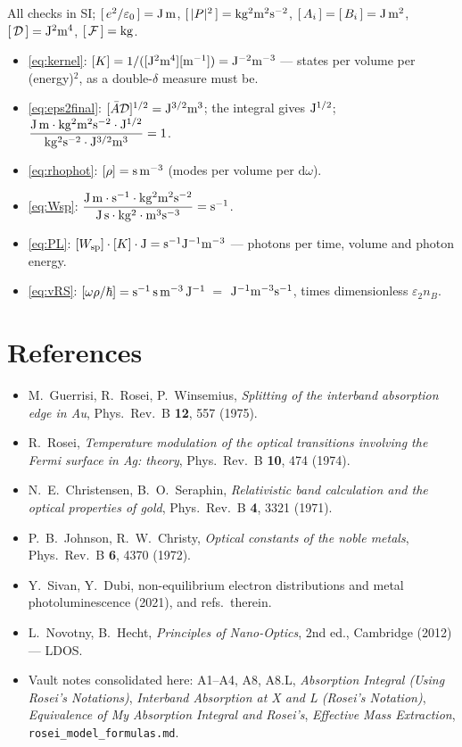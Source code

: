 \documentclass[11pt,a4paper]{article}
\numberwithin{equation}{section}
\newcommand{\cD}{\mathcal{D}}
\newcommand{\cF}{\mathcal{F}}
\newcommand{\Ab}{\bar{A}}
\newcommand{\eps}{\varepsilon}
\newcommand{\epsz}{\varepsilon_0}
\newcommand{\dd}{\mathrm{d}}
\begin{document}
All checks in SI; $[\,e^2/\epsz\,]={\rm J\,m}$,
$[\,|P|^2\,]={\rm kg^2m^2s^{-2}}$, $[\,A_i\,]=[\,B_i\,]={\rm J\,m^2}$,
$[\,\cD\,]={\rm J^2m^4}$, $[\,\cF\,]={\rm kg}$.
\begin{itemize}
\item \eqref{eq:kernel}:
$[K]=1/([{\rm J^2m^4}][{\rm m^{-1}}])={\rm J^{-2}m^{-3}}$ ---
states per volume per (energy)$^2$, as a double-$\delta$ measure must be.
\item \eqref{eq:eps2final}:
$[\Ab\cD]^{1/2}={\rm J^{3/2}m^3}$; the integral gives
${\rm J^{1/2}}$;
$\dfrac{{\rm J\,m}\cdot{\rm kg^2m^2s^{-2}}\cdot{\rm J^{1/2}}}
{{\rm kg^2s^{-2}}\cdot{\rm J^{3/2}m^3}}=1$. \checkmark
\item \eqref{eq:rhophot}: $[\rho]={\rm s\,m^{-3}}$
(modes per volume per $\dd\omega$). \checkmark
\item \eqref{eq:Wsp}:
$\dfrac{{\rm J\,m}\cdot{\rm s^{-1}}\cdot{\rm kg^2m^2s^{-2}}}
{{\rm J\,s}\cdot{\rm kg^2}\cdot{\rm m^3s^{-3}}}={\rm s^{-1}}$. \checkmark
\item \eqref{eq:PL}: $[W_{\rm sp}]\cdot[K]\cdot{\rm J}
={\rm s^{-1}J^{-1}m^{-3}}$ --- photons per time, volume and photon
energy. \checkmark
\item \eqref{eq:vRS}: $[\omega\rho/\hbar]
={\rm s^{-1}\,s\,m^{-3}\,J^{-1}\,}$$=$ ${\rm J^{-1}m^{-3}s^{-1}}$,
times dimensionless $\eps_2n_B$. \checkmark
\end{itemize}

\section*{References}
\begin{itemize}
\item M.~Guerrisi, R.~Rosei, P.~Winsemius,
\emph{Splitting of the interband absorption edge in Au},
Phys.\ Rev.\ B \textbf{12}, 557 (1975).
\item R.~Rosei, \emph{Temperature modulation of the optical
transitions involving the Fermi surface in Ag: theory},
Phys.\ Rev.\ B \textbf{10}, 474 (1974).
\item N.~E.~Christensen, B.~O.~Seraphin,
\emph{Relativistic band calculation and the optical properties of
gold}, Phys.\ Rev.\ B \textbf{4}, 3321 (1971).
\item P.~B.~Johnson, R.~W.~Christy,
\emph{Optical constants of the noble metals},
Phys.\ Rev.\ B \textbf{6}, 4370 (1972).
\item Y.~Sivan, Y.~Dubi, non-equilibrium electron distributions and
metal photoluminescence (2021), and refs.\ therein.
\item L.~Novotny, B.~Hecht, \emph{Principles of Nano-Optics},
2nd ed., Cambridge (2012) --- LDOS.
\item Vault notes consolidated here: A1--A4, A8, A8.L,
\emph{Absorption Integral (Using Rosei's Notations)},
\emph{Interband Absorption at X and L (Rosei's Notation)},
\emph{Equivalence of My Absorption Integral and Rosei's},
\emph{Effective Mass Extraction}, \texttt{rosei\_model\_formulas.md}.
\end{itemize}
\end{document}
